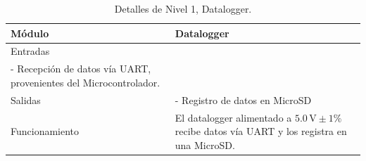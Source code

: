 
\begin{table}[h!]
    \centering
    \caption{Detalles de Nivel 1, Datalogger.}
    \label{tab:nivel1_Datalogger}
    \begin{tabular}{ll}
    \toprule
        Módulo  & Datalogger\\ 
    \midrule
        Entradas & 
        \begin{minipage}[t]{0.75\linewidth}
 - Alimentación $5.0 \, \text{V} \pm 1\%$\\
 - Recepción de datos vía UART, provenientes del Microcontrolador.
 
        \end{minipage} \\
    \midrule
        Salidas & 
        \begin{minipage}[t]{0.75\linewidth}
    - Registro de datos en MicroSD

        \end{minipage} \\
    \midrule
        Funcionamiento & 
        \begin{minipage}[t]{0.75\linewidth}
El datalogger alimentado a  $5.0 \, \text{V} \pm 1\%$ recibe datos vía UART y los registra en una MicroSD.

        \end{minipage} \\
    \bottomrule
    \end{tabular}
\end{table}
\vspace{4 cm}

